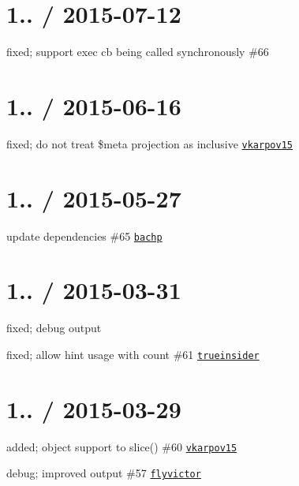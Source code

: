 \section*{1.. / 2015-\/07-\/12 }


\begin{DoxyItemize}
\item fixed; support exec cb being called synchronously \#66
\end{DoxyItemize}

\section*{1.. / 2015-\/06-\/16 }


\begin{DoxyItemize}
\item fixed; do not treat \$meta projection as inclusive \href{https://github.com/vkarpov15}{\tt vkarpov15}
\end{DoxyItemize}

\section*{1.. / 2015-\/05-\/27 }


\begin{DoxyItemize}
\item update dependencies \#65 \href{https://github.com/bachp}{\tt bachp}
\end{DoxyItemize}

\section*{1.. / 2015-\/03-\/31 }


\begin{DoxyItemize}
\item fixed; debug output
\item fixed; allow hint usage with count \#61 \href{https://github.com/trueinsider}{\tt trueinsider}
\end{DoxyItemize}

\section*{1.. / 2015-\/03-\/29 }


\begin{DoxyItemize}
\item added; object support to slice() \#60 \href{https://github.com/vkarpov15}{\tt vkarpov15}
\item debug; improved output \#57 \href{https://github.com/flyvictor}{\tt flyvictor}
\end{DoxyItemize}

